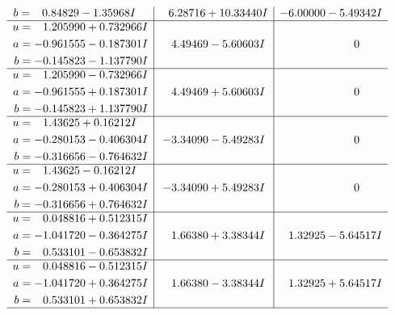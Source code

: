 \documentclass[1p]{elsarticle_modified}
\theoremstyle{definition}
\begin{document}
$$\begin{array}{c|c|c}
\begin{aligned}
b &= \phantom{-}0.84829 - 1.35968 I\end{aligned}
 & \phantom{-}6.28716 + 10.33440 I & -6.00000 - 5.49342 I \\ \hline\begin{aligned}
u &= \phantom{-}1.205990 + 0.732966 I \\
a &= -0.961555 - 0.187301 I \\
b &= -0.145823 - 1.137790 I\end{aligned}
 & \phantom{-}4.49469 - 5.60603 I & \phantom{-0.000000 } 0 \\ \hline\begin{aligned}
u &= \phantom{-}1.205990 - 0.732966 I \\
a &= -0.961555 + 0.187301 I \\
b &= -0.145823 + 1.137790 I\end{aligned}
 & \phantom{-}4.49469 + 5.60603 I & \phantom{-0.000000 } 0 \\ \hline\begin{aligned}
u &= \phantom{-}1.43625 + 0.16212 I \\
a &= -0.280153 - 0.406304 I \\
b &= -0.316656 - 0.764632 I\end{aligned}
 & -3.34090 - 5.49283 I & \phantom{-0.000000 } 0 \\ \hline\begin{aligned}
u &= \phantom{-}1.43625 - 0.16212 I \\
a &= -0.280153 + 0.406304 I \\
b &= -0.316656 + 0.764632 I\end{aligned}
 & -3.34090 + 5.49283 I & \phantom{-0.000000 } 0 \\ \hline\begin{aligned}
u &= \phantom{-}0.048816 + 0.512315 I \\
a &= -1.041720 - 0.364275 I \\
b &= \phantom{-}0.533101 - 0.653832 I\end{aligned}
 & \phantom{-}1.66380 + 3.38344 I & \phantom{-}1.32925 - 5.64517 I \\ \hline\begin{aligned}
u &= \phantom{-}0.048816 - 0.512315 I \\
a &= -1.041720 + 0.364275 I \\
b &= \phantom{-}0.533101 + 0.653832 I\end{aligned}
 & \phantom{-}1.66380 - 3.38344 I & \phantom{-}1.32925 + 5.64517 I\\
 \hline 
 \end{array}$$\newpage\newpage\renewcommand{\arraystretch}{1}
\end{document}
